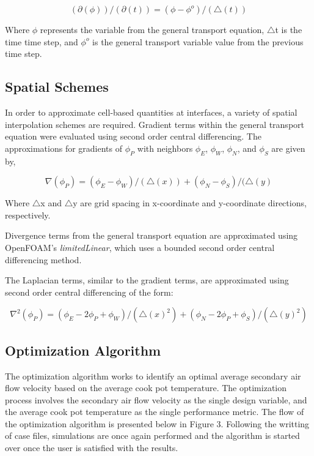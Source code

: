 \documentclass[3p,times,twocolumn]{elsarticle}
\begin{document}
\[(\partial(\phi))/(\partial(t)) = (\phi - \phi^{o})/(\triangle(t))\]

Where $\phi$ represents the variable from the general transport equation, $\triangle$t is the time time step, and $\phi^{o}$ is the general transport variable value from the previous time step.

\subsection{Spatial Schemes}

In order to approximate cell-based quantities at interfaces, a variety of spatial interpolation schemes are required. Gradient terms within the general transport equation were evaluated using second order central differencing. The approximations for gradients of $\phi_{P}$ with neighbors $\phi_{E}$, $\phi_{W}$, $\phi_{N}$, and $\phi_{S}$ are given by,

\[\nabla(\phi_{P}) = (\phi_{E} - \phi_{W})/(\triangle(x)) + (\phi_{N} - \phi_{S})/(\triangle(y)\]


Where $\triangle$x and $\triangle$y are grid spacing in x-coordinate and y-coordinate directions, respectively.

Divergence terms from the general transport equation are approximated using OpenFOAM's \textit{limitedLinear}, which uses a bounded second order central differencing method.

The Laplacian terms, similar to the gradient terms, are approximated using second order central differencing of the form:

\[\nabla^{2}(\phi_{P}) = (\phi_{E}-2\phi_{P} +\phi_{W})/(\triangle(x)^{2}) + (\phi_{N}-2\phi_{P} + \phi_{S})/(\triangle(y)^{2})\]

\subsection{Optimization Algorithm}
The optimization algorithm works to identify an optimal average secondary air flow velocity based on the average cook pot temperature. The optimization process involves the secondary air flow velocity as the single design variable, and the average cook pot temperature as the single performance metric. The flow of the optimization algorithm is presented below in Figure 3. Following the writting of case files, simulations are once again performed and the algorithm is started over once the user is satisfied with the results.
\end{document}

